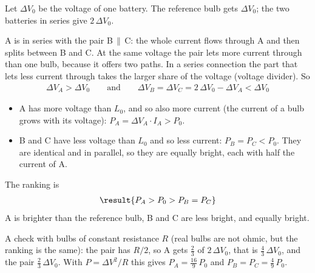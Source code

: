 Let $\Delta V_0$ be the voltage of one battery. The reference bulb gets $\Delta V_0$; the two batteries in series give $2\,\Delta V_0$.

A is in series with the pair B\,$\|$\,C: the whole current flows through A and then splits between B and C. At the same voltage the pair lets more current through than one bulb, because it offers two paths. In a series connection the part that lets less current through takes the larger share of the voltage (voltage divider). So
\begin{align}
 \Delta V_A > \Delta V_0 \qquad\text{and}\qquad \Delta V_B = \Delta V_C = 2\,\Delta V_0 - \Delta V_A < \Delta V_0
\end{align}

\begin{itemize}
\item A has more voltage than $L_0$, and so also more current (the current of a bulb grows with its voltage): $P_A = \Delta V_A\cdot I_A > P_0$.
\item B and C have less voltage than $L_0$ and so less current: $P_B = P_C < P_0$. They are identical and in parallel, so they are equally bright, each with half the current of A.
\end{itemize}

The ranking is
\begin{align}
 \result{P_A > P_0 > P_B = P_C}
\end{align}
A is brighter than the reference bulb, B and C are less bright, and equally bright.

A check with bulbs of constant resistance $R$ (real bulbs are not ohmic, but the ranking is the same): the pair has $R/2$, so A gets $\frac{2}{3}$ of $2\,\Delta V_0$, that is $\frac{4}{3}\,\Delta V_0$, and the pair $\frac{2}{3}\,\Delta V_0$. With $P = \Delta V^2/R$ this gives $P_A = \frac{16}{9}\,P_0$ and $P_B = P_C = \frac{4}{9}\,P_0$.
